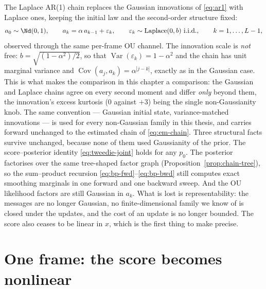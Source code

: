 The Laplace AR(1) chain replaces the Gaussian innovations of
\eqref{eq:ar1} with Laplace ones, keeping the initial law and the
second-order structure fixed:
\begin{equation}
  a_0 \sim \Nd(0,1), \qquad
  a_k = \alpha\, a_{k-1} + \varepsilon_k, \qquad
  \varepsilon_k \sim \mathrm{Laplace}(0, b) \ \text{i.i.d.}, \qquad
  k = 1,\dots,L-1 ,
  \label{eq:l-chain-prior}
\end{equation}
observed through the same per-frame OU channel. The innovation scale is
\emph{not} free: $b = \sqrt{(1-\alpha^2)/2}$, so that
$\operatorname{Var}(\varepsilon_k) = 1-\alpha^2$ and the chain has unit
marginal variance and $\operatorname{Cov}(a_j,a_k)=\alpha^{|j-k|}$, exactly
as in the Gaussian case. This is what makes the comparison in this chapter
a comparison: the Gaussian and Laplace chains agree on every second moment
and differ \emph{only} beyond them, the innovation's excess kurtosis
($0$ against $+3$) being the single non-Gaussianity knob. The same
convention --- Gaussian initial state, variance-matched innovations --- is
used for every non-Gaussian family in this thesis, and carries forward
unchanged to the estimated chain of \eqref{eq:em-chain}. Three structural facts
survive unchanged, because none of them used Gaussianity of the prior.
The score--posterior identity \eqref{eq:tweedie-joint} holds for any
$p_0$. The posterior factorises over the same tree-shaped factor graph
(Proposition~\ref{prop:chain-tree}), so the sum--product recursion
\eqref{eq:bp-fwd}--\eqref{eq:bp-bwd} still computes exact smoothing
marginals in one forward and one backward sweep. And the OU likelihood
factors are
still Gaussian in $a_k$. What is lost is representability: the messages
are no longer Gaussian, no finite-dimensional family we know of is closed
under the updates, and the cost of an update is no longer bounded. The
score also ceases to be linear in $x$, which is the first thing to make
precise.

\section{One frame: the score becomes nonlinear}\label{sec:l-K1}

